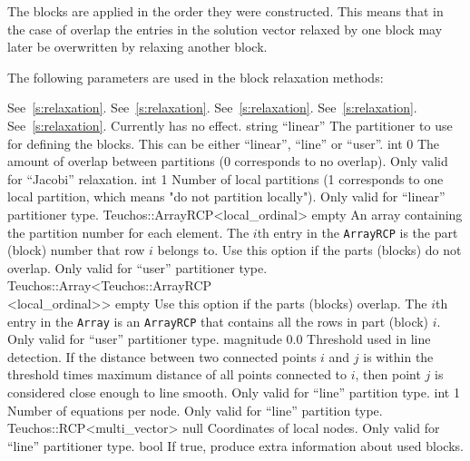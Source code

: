The blocks are applied in the order they were constructed. This means that in
the case of overlap the entries in the solution vector relaxed by one block may
later be overwritten by relaxing another block.

The following parameters are used in the block relaxation methods:

    {See~\ref{s:relaxation}.}
    {See~\ref{s:relaxation}.}
    {See~\ref{s:relaxation}.}
    {See~\ref{s:relaxation}.}
    {See~\ref{s:relaxation}. Currently has no effect. }
    {string}
    {``linear''}
    {The partitioner to use for defining the blocks.  This can be either
     ``linear'', ``line'' or ``user''.}
    {int}
    {0}
    {The amount of overlap between partitions (0 corresponds to no overlap).
     Only valid for ``Jacobi'' relaxation.}
    {int}
    {1}
    {Number of local partitions (1 corresponds to one local partition, which
     means "do not partition locally"). Only valid for ``linear'' partitioner
     type.}
    {Teuchos::ArrayRCP<local\_ordinal>}
    {empty}
    {An array containing the partition number for each element.
     The $i$th entry in the \texttt{ArrayRCP} is the part (block) number that
     row $i$ belongs to. Use this option if the parts (blocks) do not
     overlap. Only valid for ``user'' partitioner type.}
    {Teuchos::Array<Teuchos::ArrayRCP\\<local\_ordinal>>}
    {empty}
    {Use this option if the parts (blocks) overlap. The $i$th entry in the
     \texttt{Array} is an \texttt{ArrayRCP} that contains all the rows in part
     (block) $i$. Only valid for ``user'' partitioner type.}
    {magnitude}
    {0.0}
    {Threshold used in line detection. If the distance between two connected
     points $i$ and $j$ is within the threshold times maximum distance of all
     points connected to $i$, then point $j$ is considered close enough to line
     smooth. Only valid for ``line'' partition type.}
    {int}
    {1}
    {Number of equations per node. Only valid for ``line'' partition type.}
    {Teuchos::RCP<multi\_vector>}
    {null}
    {Coordinates of local nodes. Only valid for ``line'' partitioner type.}
    {bool}
    {\false}
    {If true, produce extra information about used blocks.}

